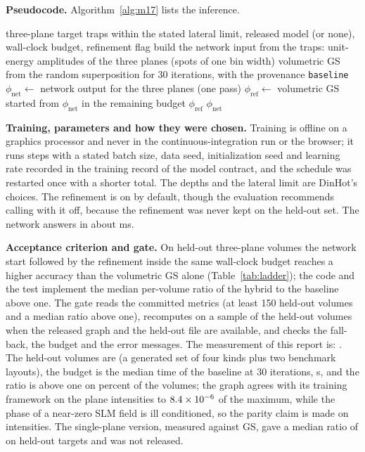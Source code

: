 \textbf{Pseudocode.} Algorithm~\ref{alg:m17} lists the inference.

\begin{algorithm}[t]
\caption{Inference of the volume network with the refinement and the fall-back (training is offline and not part of the run).}
\label{alg:m17}
\begin{algorithmic}[1]
\Require three-plane target traps within the stated lateral limit, released model (or none), wall-clock budget, refinement flag
\State build the network input from the traps: unit-energy amplitudes of the three planes (spots of one bin width)
 \State \Return volumetric GS from the random superposition for 30 iterations, with the provenance \texttt{baseline} \EndIf
\State $\phi_{\mathrm{net}}\gets$ network output for the three planes (one pass)
 \State $\phi_{\mathrm{ref}}\gets$ volumetric GS started from $\phi_{\mathrm{net}}$ in the remaining budget
   \State \Return $\phi_{\mathrm{ref}}$ \EndIf
\EndIf
\State \Return $\phi_{\mathrm{net}}$
\end{algorithmic}
\end{algorithm}

\textbf{Training, parameters and how they were chosen.} Training is offline on a graphics processor and never in the continuous-integration run or the browser; it runs \cghSteps{} steps with a stated batch size, data seed, initialization seed and learning rate recorded in the training record of the model contract, and the schedule was restarted once with a shorter total. The depths and the lateral limit are DinHot's choices. The refinement is on by default, though the evaluation recommends calling with it off, because the refinement was never kept on the held-out set. The network answers in about \cghNetMs{} ms.

\textbf{Acceptance criterion and gate.} On held-out three-plane volumes the network start followed by the refinement inside the same wall-clock budget reaches a higher accuracy than the volumetric GS alone (Table~\ref{tab:ladder}); the code and the test implement the median per-volume ratio of the hybrid to the baseline above one. The gate reads the committed metrics (at least 150 held-out volumes and a median ratio above one), recomputes on a sample of the held-out volumes when the released graph and the held-out file are available, and checks the fall-back, the budget and the error messages. The measurement of this report is: . The held-out volumes are \cghN{} (a generated set of four kinds plus two benchmark layouts), the budget is the median time of the baseline at 30 iterations, \cghBudgetS{} s, and the ratio is above one on \cghShareAbove{} percent of the volumes; the graph agrees with its training framework on the plane intensities to $8.4\times 10^{-6}$ of the maximum, while the phase of a near-zero SLM field is ill conditioned, so the parity claim is made on intensities. The single-plane version, measured against GS, gave a median ratio of \cghTwoDMed{} on \cghTwoDN{} held-out targets and was not released.

